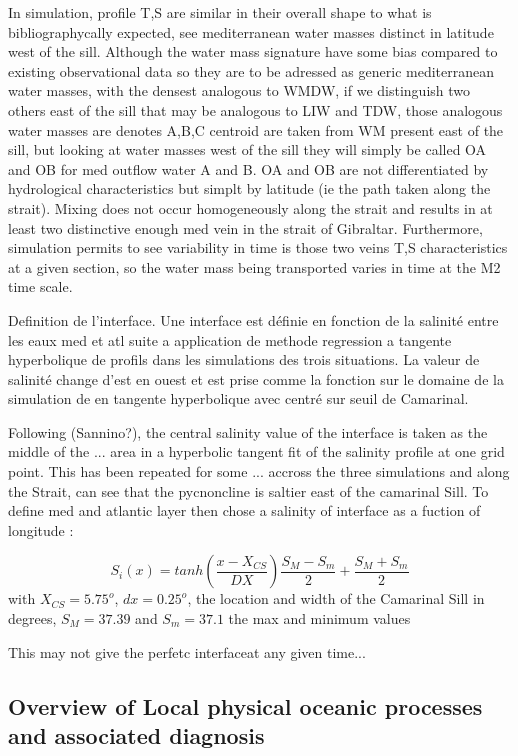 In simulation, profile T,S are similar in their overall shape to what is bibliographycally expected, see mediterranean water masses distinct in latitude west of the sill.
Although the water mass signature have some bias compared to existing observational data so they are to be adressed as generic mediterranean water masses, with the densest analogous to WMDW, if we distinguish two others east of the sill that may be analogous to LIW and TDW, those analogous water masses are denotes A,B,C centroid are taken from WM present east of the sill, but looking at water masses west of the sill they will simply be called OA and OB for med outflow water A and B. OA and OB are not differentiated by hydrological characteristics but simplt by latitude (ie the path taken along the strait).
Mixing does not occur homogeneously along the strait and results in at least two distinctive enough med vein in the strait of Gibraltar. Furthermore, simulation permits to see variability in time is those two veins T,S characteristics at a given section, so the water mass being transported varies in time at the M2 time scale.

Definition de l'interface. Une interface est définie en fonction de la salinité entre les eaux med et atl suite a application de methode regression a tangente hyperbolique de profils dans les simulations des trois situations. La valeur de salinité change d'est en ouest et est prise comme la fonction sur le domaine de la simulation de en tangente hyperbolique avec centré sur seuil de Camarinal.


Following (Sannino?), the central salinity value of the interface is taken as the middle of the ... area in a hyperbolic tangent fit of the salinity profile at one grid point. This has been repeated for some ... accross the three simulations and along the Strait, can see that the pycnoncline is saltier east of the camarinal Sill. To define med and atlantic layer then chose a salinity of interface as a fuction of longitude :

\begin{equation}
	S_i(x)=tanh(\frac{x-X_{CS}}{DX})\frac{S_M-S_m}{2}+\frac{S_M+S_m}{2}
\end{equation}
with $X_{CS}=5.75^o$, $dx=0.25^o$, the location and width of the Camarinal Sill in degrees, $S_M=37.39$ and $S_m=37.1$ the max and minimum values

This may not give the perfetc interfaceat any given time...



\subsection{Overview of Local physical oceanic processes and associated diagnosis}


